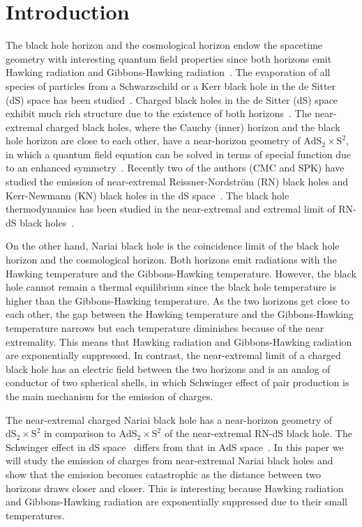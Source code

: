 \documentclass[aps,nofootinbib,superscriptaddress
]{revtex4}
\begin{document}
\section{Introduction}
The black hole horizon and the cosmological horizon endow the spacetime geometry with interesting quantum field properties since both horizons emit Hawking radiation and Gibbons-Hawking radiation~\cite{Gibbons:1977mu}. The evaporation of all species of particles from a Schwarzschild or a Kerr black hole in the de Sitter (dS) space has been studied~\cite{Gregory:2021ozs}. Charged black holes in the de Sitter (dS) space exhibit much rich structure due to the existence of both horizons~\cite{Romans:1991nq}.
The near-extremal charged black holes, where the Cauchy (inner) horizon and the black hole horizon are close to each other, have a near-horizon geometry of $\mathrm{AdS}_2 \times \mathrm{S}^2$, in which a quantum field equation can be solved in terms of special function due to an enhanced symmetry~\cite{Bardeen:1999px}. Recently two of the authors (CMC and SPK) have studied the emission of near-extremal Reissner-Nordstr\"{o}m (RN) black holes and Kerr-Newmann (KN) black holes in the dS space~\cite{Chen:2020mqs, Chen:2021jwy}. The black hole thermodynamics has been studied in the near-extremal and extremal limit of RN-dS black holes~\cite{Castro:2022cuo}.


On the other hand, Nariai black hole is the coincidence limit of the black hole horizon and the cosmological horizon. Both horizons emit radiations with the Hawking temperature and the Gibbons-Hawking temperature. However, the black hole cannot remain a thermal equilibrium since the black hole temperature is higher than the Gibbons-Hawking temperature. As the two horizons get close to each other, the gap between the Hawking temperature and the Gibbons-Hawking temperature narrows but each temperature diminishes because of the near extremality. This means that Hawking radiation and Gibbons-Hawking radiation are exponentially suppressed. In contrast, the near-extremal limit of a charged black hole has an electric field between the two horizons and is an analog of conductor of two spherical shells, in which Schwinger effect of pair production is the main mechanism for the emission of charges.


The near-extremal charged Nariai black hole has a near-horizon geometry of $\mathrm{dS}_2 \times \mathrm{S}^2$ in comparison to $\mathrm{AdS}_2 \times \mathrm{S}^2$ of the near-extremal RN-dS black hole. The Schwinger effect in $\mathrm{dS}$ space~\cite{Garriga:1994bm, Kim:2008xv} differs from that in $\mathrm{AdS}$ space~\cite{Pioline:2005pf, Kim:2008xv}. In this paper we will study the emission of charges from near-extremal Nariai black holes and show that the emission becomes catastrophic as the distance between two horizons draws closer and closer. This is interesting because Hawking radiation and Gibbons-Hawking radiation are exponentially suppressed due to their small temperatures.
\end{document}
